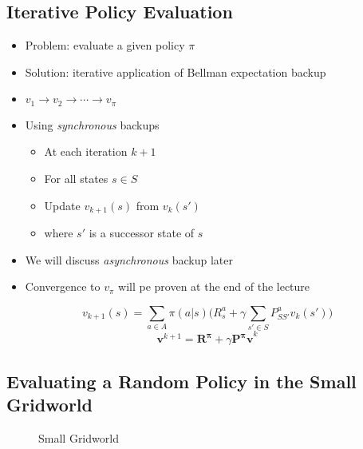 \documentclass[varwidth]{article}
\begin{document}
\subsection{Iterative Policy Evaluation}


\begin{itemize}
    \item Problem: evaluate a given policy $\pi$
    \item Solution: iterative application of Bellman expectation backup
    \item $v_1 \rightarrow v_2 \rightarrow \cdots \rightarrow v_\pi  $
    \item Using \textit{synchronous} backups
    \begin{itemize}
        \item At each iteration $k+1$
        \item For all states $s\in S$
        \item Update $v_{k+1}(s) $ from $v_k(s')$
        \item where $s'$ is a successor state of $s$
    \end{itemize}
    \item We will discuss \textit{asynchronous} backup later
    \item Convergence to $v_\pi$ will pe proven at the end of the lecture
\end{itemize}
$$ v_{k+1}(s)  = \sum_{a \in A} \pi (a|s) \bigg( R_s^a + \gamma \sum_{s' \in S} P_{SS'}^a v_k(s')
\bigg)  $$
$$ \mathbold{v}^{k+1} = \mathbold{R^\pi}  + \gamma \mathbold{P^\pi v}^k $$
\newpage
\subsection{Evaluating a Random Policy in the Small Gridworld}
\begin{figure}[H]
  \centering
  \caption{Small Gridworld}
  \label{fig:tikz:my}
\end{figure}
\end{document}
